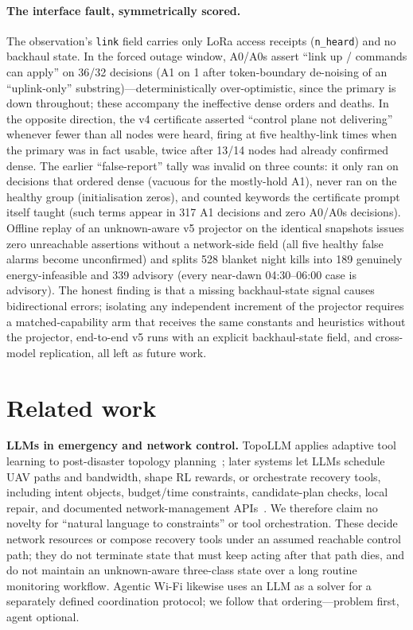 \documentclass[11pt]{article}
\begin{document}
\paragraph{The interface fault, symmetrically scored.} The observation's \texttt{link} field
carries only LoRa access receipts (\texttt{n\_heard}) and no backhaul state. In the forced outage
window, A0/A0s assert ``link up / commands can apply'' on 36/32 decisions (A1 on 1 after
token-boundary de-noising of an ``uplink-only'' substring)---deterministically over-optimistic,
since the primary is down throughout; these accompany the ineffective dense orders and deaths. In
the opposite direction, the v4 certificate asserted ``control plane not delivering'' whenever
fewer than all nodes were heard, firing at five healthy-link times when the primary was in fact
usable, twice after 13/14 nodes had already confirmed dense. The earlier ``false-report'' tally was
invalid on three counts: it only ran on decisions that ordered dense (vacuous for the mostly-hold
A1), never ran on the healthy group (initialisation zeros), and counted keywords the certificate
prompt itself taught (such terms appear in 317 A1 decisions and zero A0/A0s decisions). Offline
replay of an unknown-aware v5 projector on the identical snapshots issues zero unreachable
assertions without a network-side field (all five healthy false alarms become unconfirmed) and
splits 528 blanket night kills into 189 genuinely energy-infeasible and 339 advisory (every
near-dawn 04:30--06:00 case is advisory). The honest finding is that a missing backhaul-state
signal causes bidirectional errors; isolating any independent increment of the projector requires
a matched-capability arm that receives the same constants and heuristics without the projector,
end-to-end v5 runs with an explicit backhaul-state field, and cross-model replication, all left as
future work.

\section{Related work}
\label{sec:related}
\textbf{LLMs in emergency and network control.} TopoLLM applies adaptive tool learning to
post-disaster topology planning~\cite{topollm}; later systems let LLMs schedule UAV paths and
bandwidth, shape RL rewards, or orchestrate recovery tools, including intent objects, budget/time
constraints, candidate-plan checks, local repair, and documented network-management
APIs~\cite{icgrestore,ossgpt}. We therefore claim no novelty for ``natural language to
constraints'' or tool orchestration. These decide network resources or compose recovery tools
under an assumed reachable control path; they do not terminate state that must keep acting after
that path dies, and do not maintain an unknown-aware three-class state over a long routine
monitoring workflow. Agentic Wi-Fi likewise uses an LLM as a solver for a separately defined
coordination protocol; we follow that ordering---problem first, agent optional.
\end{document}
